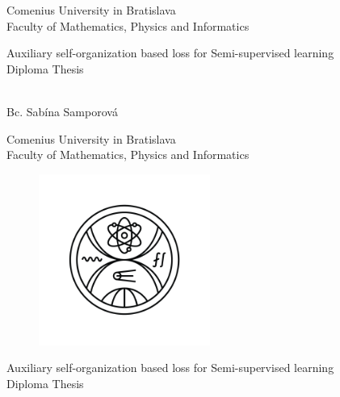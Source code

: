 \documentclass[12pt, twoside]{book}
\def\mfrok{2024}
\def\mfnazov{Auxiliary self-organization based loss for Semi-supervised learning}
\def\mftyp{Diploma Thesis}
\def\mfautor{Bc. Sabína Samporová}
\begin{document}
     
\frontmatter
\pagestyle{empty}


\begin{center}
  \sc\large
  Comenius University in Bratislava\\
  Faculty of Mathematics, Physics and Informatics
\end{center}



\vfill

\begin{center}
\sc\large
{\LARGE\mfnazov}\\
\mftyp
\end{center}

\vfill

{\sc\large 
\noindent \mfrok\\
\mfautor
}

\cleardoublepage


\noindent

\begin{center}
\sc  
\large
  Comenius University in Bratislava\\
  Faculty of Mathematics, Physics and Informatics
\end{center}

\vfill
\begin{figure}[h!]
    \centering
    \includegraphics[width=0.5\textwidth]{figs/FMFI_logo_BP.png}
\end{figure}

\vfill


\begin{center}
{\LARGE\mfnazov}\\
\mftyp
\end{center}
\end{document}
